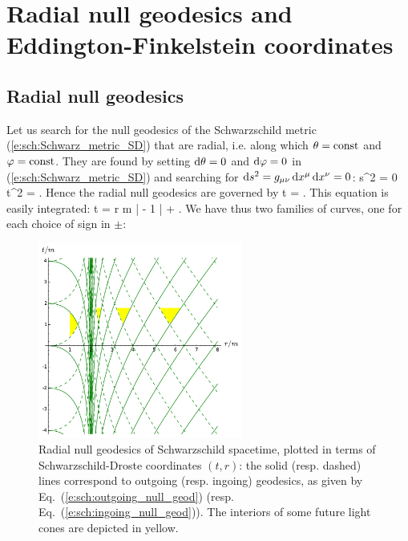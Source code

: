 
\section{Radial null geodesics and Eddington-Finkelstein coordinates}

\subsection{Radial null geodesics}
\label{s:sch:rad_null_geod}

Let us search for the null geodesics of the Schwarzschild metric
(\ref{e:sch:Schwarz_metric_SD}) that are radial, i.e. along which
$\theta=\mathrm{const}$ and $\varphi=\mathrm{const}$. They are found by
setting  $\mathrm{d}\theta=0$ and $\mathrm{d}\varphi=0$
in (\ref{e:sch:Schwarz_metric_SD})
and searching for $\mathrm{d} s^2 = g_{\mu\nu}\, \mathrm{d} x^\mu \, \mathrm{d} x^\nu = 0$:
\be \label{e:sch:radial_null}
    \D s^2 = 0 \iff \D t^2 =  .
\ee
Hence the radial null geodesics are governed by
\be
    \D t = \pm {} .
\ee
This equation is easily integrated:
\be
    t = \pm r  m \ln \left|  - 1 \right| +  .
\ee
We have thus two families of curves, one for each choice
of sign in $\pm$:

\begin{figure}
\centerline{\includegraphics[width=0.6\textwidth]{sch_rad_null_geod.pdf}}
\caption[]{\label{f:sch:rad_null_geod} \footnotesize
Radial null geodesics of Schwarzschild spacetime, plotted in terms
of Schwarzschild-Droste coordinates $(t,r)$: the solid (resp. dashed) lines
correspond to outgoing (resp. ingoing) geodesics, as given by Eq.~(\ref{e:sch:outgoing_null_geod})
(resp. Eq.~(\ref{e:sch:ingoing_null_geod})). The interiors of some future light
cones are depicted in yellow.}
\end{figure}

